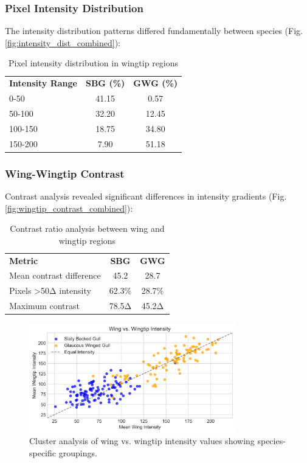 \documentclass[a4paper,12pt]{report}
\begin{document}
\subsubsection{Pixel Intensity Distribution}
The intensity distribution patterns differed fundamentally between species (Fig. \ref{fig:intensity_dist_combined}):

\begin{table}[H]
\centering
\caption{Pixel intensity distribution in wingtip regions}
\label{tab:intensity_distribution}
\begin{tabular}{lcc}
\hline
\textbf{Intensity Range} & \textbf{SBG (\%)} & \textbf{GWG (\%)} \\
0-50 & 41.15 & 0.57 \\
50-100 & 32.20 & 12.45 \\
100-150 & 18.75 & 34.80 \\
150-200 & 7.90 & 51.18 \\ 
\end{tabular}
\end{table}

\subsubsection{Wing-Wingtip Contrast}
Contrast analysis revealed significant differences in intensity gradients (Fig. \ref{fig:wingtip_contrast_combined}):

\begin{table}[H]
\centering
\caption{Contrast ratio analysis between wing and wingtip regions}
\label{tab:contrast_ratios}
\begin{tabular}{lcc}
\hline
\textbf{Metric} & \textbf{SBG} & \textbf{GWG} \\
Mean contrast difference & 45.2 & 28.7 \\
Pixels >50Δ intensity & 62.3\% & 28.7\% \\
Maximum contrast & 78.5Δ & 45.2Δ \\ 
\end{tabular}
\end{table}

\begin{figure}[H]
\centering
\includegraphics[width=0.8\textwidth]{images/REPORT_IMAGES_INTENSITY/I2/clusterwingwingtip.png}
\caption{Cluster analysis of wing vs. wingtip intensity values showing species-specific groupings.}
\label{fig:cluster_wingtip}
\end{figure}
\end{document}
